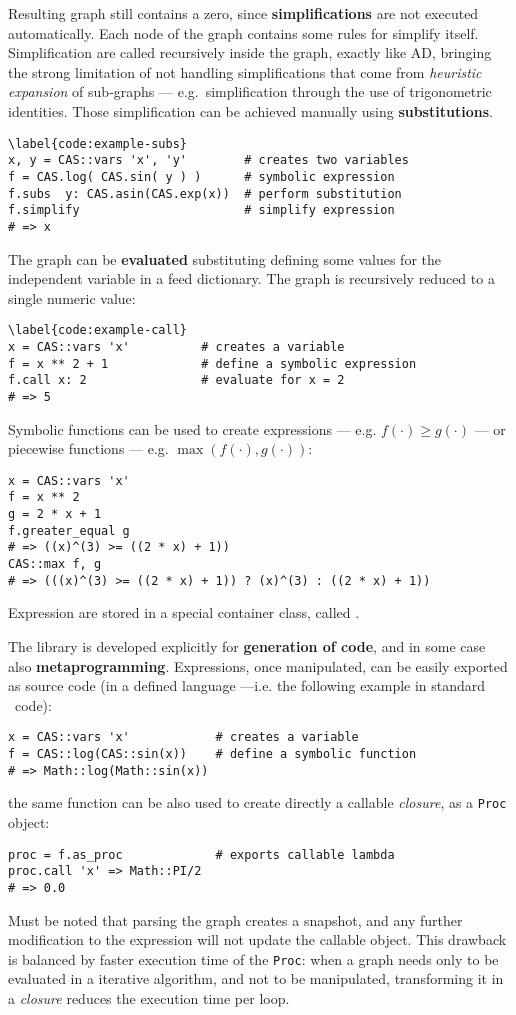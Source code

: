 Resulting graph still contains a zero, since \textbf{simplifications} are not executed automatically. Each node of the graph contains some rules for simplify itself. Simplification are called recursively inside the graph, exactly like AD, bringing the strong limitation of not handling simplifications that come from \emph{heuristic expansion} of sub-graphs --- e.g.\ simplification through the use of trigonometric identities. Those simplification can be achieved manually using \textbf{substitutions}.
\begin{lstlisting}
\label{code:example-subs}
x, y = CAS::vars 'x', 'y'        # creates two variables
f = CAS.log( CAS.sin( y ) )      # symbolic expression
f.subs  y: CAS.asin(CAS.exp(x))  # perform substitution
f.simplify                       # simplify expression
# => x
\end{lstlisting}

The graph can be \textbf{evaluated} substituting defining some values for the independent variable in a feed dictionary. The graph is recursively reduced to a single numeric value:
\begin{lstlisting}
\label{code:example-call}
x = CAS::vars 'x'          # creates a variable
f = x ** 2 + 1             # define a symbolic expression
f.call x: 2                # evaluate for x = 2
# => 5
\end{lstlisting}

Symbolic functions can be used to create expressions --- e.g. $f(\cdot) \geq g(\cdot)$ --- or piecewise functions --- e.g. $\max(f(\cdot), g(\cdot))$:
\begin{lstlisting}
x = CAS::vars 'x'
f = x ** 2
g = 2 * x + 1
f.greater_equal g
# => ((x)^(3) >= ((2 * x) + 1))
CAS::max f, g
# => (((x)^(3) >= ((2 * x) + 1)) ? (x)^(3) : ((2 * x) + 1))
\end{lstlisting}
Expression are stored in a special container class, called \CASExpression.

The library is developed explicitly for \textbf{generation of code}, and in some case also \textbf{meta\-programming}. Expressions, once manipulated, can be easily exported as source code (in a defined language ---i.e. the following example in standard \Ruby~code):
\begin{lstlisting}
x = CAS::vars 'x'            # creates a variable
f = CAS::log(CAS::sin(x))    # define a symbolic function
# => Math::log(Math::sin(x))
\end{lstlisting}
the same function can be also used to create directly a callable \emph{closure}, as a \texttt{Proc} object:
\begin{lstlisting}
proc = f.as_proc             # exports callable lambda
proc.call 'x' => Math::PI/2
# => 0.0
\end{lstlisting}
Must be noted that parsing the graph creates a snapshot, and any further modification to the expression will not update the callable object. This drawback is balanced by faster execution time of the \texttt{Proc}: when a graph needs only to be evaluated in a iterative algorithm, and not to be manipulated, transforming it in a \emph{closure} reduces the execution time per loop.
